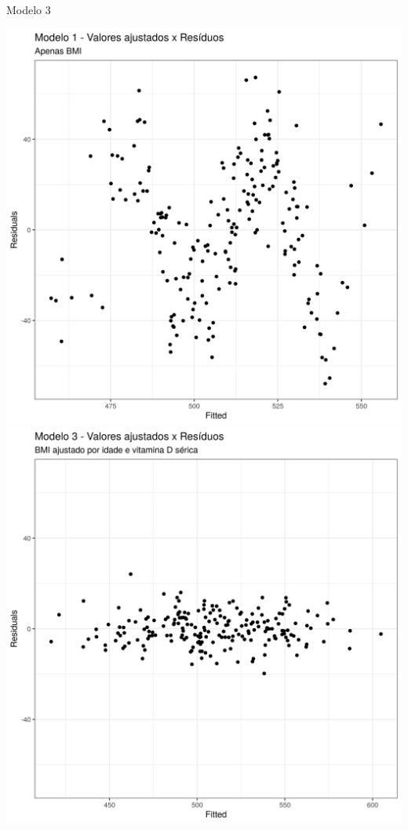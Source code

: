 \documentclass{beamer}
\begin{document}
\begin{frame}{\scriptsize Modelo 3}
  \begin{center}
    \includegraphics[height=.6\textheight]{Cap31-32/pratica-rlm1-resid}
    \includegraphics[height=.6\textheight]{Cap31-32/pratica-rlm3-resid}
  \end{center}
\end{frame}
\end{document}
